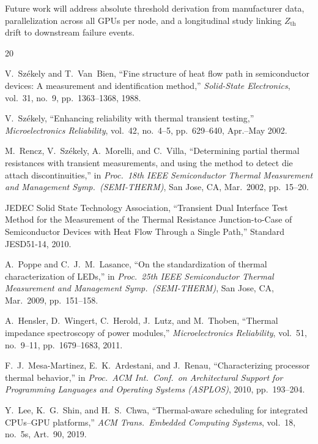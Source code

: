 \documentclass[conference]{IEEEtran}
\begin{document}
Future work will address absolute threshold derivation from
manufacturer data, parallelization across all GPUs per node, and a
longitudinal study linking $Z_\text{th}$ drift to downstream failure
events.


\begin{thebibliography}{20}

V.~Sz{\'e}kely and T.~Van~Bien, ``Fine structure of heat flow path in
semiconductor devices: A measurement and identification method,''
\emph{Solid-State Electronics}, vol.~31, no.~9, pp.~1363--1368, 1988.

V.~Sz{\'e}kely, ``Enhancing reliability with thermal transient testing,''
\emph{Microelectronics Reliability}, vol.~42, no.~4--5, pp.~629--640,
Apr.--May 2002.

M.~Rencz, V.~Sz{\'e}kely, A.~Morelli, and C.~Villa, ``Determining
partial thermal resistances with transient measurements, and using the
method to detect die attach discontinuities,'' in \emph{Proc.\ 18th IEEE
Semiconductor Thermal Measurement and Management Symp.\ (SEMI-THERM)},
San Jose, CA, Mar.\ 2002, pp.~15--20.

JEDEC Solid State Technology Association, ``Transient Dual Interface Test
Method for the Measurement of the Thermal Resistance Junction-to-Case of
Semiconductor Devices with Heat Flow Through a Single Path,''
Standard JESD51-14, 2010.

A.~Poppe and C.~J.~M.~Lasance, ``On the standardization of thermal
characterization of LEDs,'' in \emph{Proc.\ 25th IEEE Semiconductor
Thermal Measurement and Management Symp.\ (SEMI-THERM)}, San Jose, CA,
Mar.\ 2009, pp.~151--158.

A.~Hensler, D.~Wingert, C.~Herold, J.~Lutz, and M.~Thoben, ``Thermal
impedance spectroscopy of power modules,'' \emph{Microelectronics
Reliability}, vol.~51, no.~9--11, pp.~1679--1683, 2011.

F.~J.~Mesa-Martinez, E.~K.~Ardestani, and J.~Renau, ``Characterizing
processor thermal behavior,'' in \emph{Proc.\ ACM Int.\ Conf.\ on
Architectural Support for Programming Languages and Operating Systems
(ASPLOS)}, 2010, pp.~193--204.

Y.~Lee, K.~G.~Shin, and H.~S.~Chwa, ``Thermal-aware scheduling for
integrated CPUs--GPU platforms,'' \emph{ACM Trans.\ Embedded Computing
Systems}, vol.~18, no.~5s, Art.~90, 2019.


\end{thebibliography}
\end{document}
